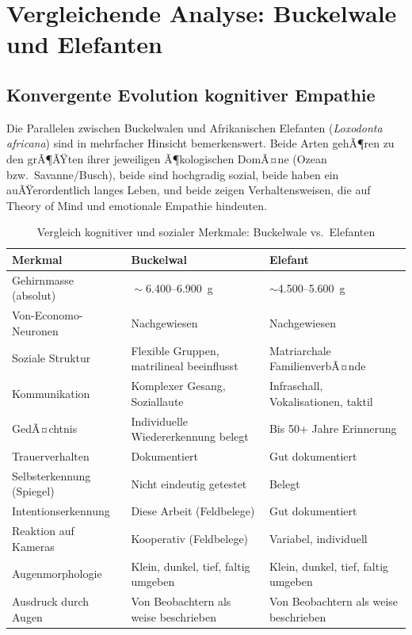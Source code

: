 ﻿\documentclass[12pt,a4paper]{article}
\theoremstyle{definition}
\theoremstyle{remark}
\begin{document}
\section{Vergleichende Analyse: Buckelwale und Elefanten}
\label{sec:elefanten}

\subsection{Konvergente Evolution kognitiver Empathie}

Die Parallelen zwischen Buckelwalen und Afrikanischen Elefanten
(\textit{Loxodonta africana}) sind in mehrfacher Hinsicht bemerkenswert.
Beide Arten gehÃ¶ren zu den grÃ¶ÃŸten ihrer jeweiligen Ã¶kologischen DomÃ¤ne
(Ozean bzw.\ Savanne/Busch), beide sind hochgradig sozial, beide haben
ein auÃŸerordentlich langes Leben, und beide zeigen Verhaltensweisen, die auf
Theory of Mind und emotionale Empathie hindeuten.

\begin{table}[h]
  \centering
  \caption{Vergleich kognitiver und sozialer Merkmale: Buckelwale vs.\ Elefanten}
  \label{tab:vergleich}
  \begin{tabularx}{\textwidth}{lXX}
    \toprule
    \textbf{Merkmal} & \textbf{Buckelwal} & \textbf{Elefant} \\
    \midrule
    Gehirnmasse (absolut) & $\sim$6.400--6.900~g & $\sim$4.500--5.600~g \\
    Von-Economo-Neuronen & Nachgewiesen & Nachgewiesen \\
    Soziale Struktur & Flexible Gruppen, matrilineal beeinflusst &
      Matriarchale FamilienverbÃ¤nde \\
    Kommunikation & Komplexer Gesang, Soziallaute & Infraschall, Vokalisationen, taktil \\
    GedÃ¤chtnis & Individuelle Wiedererkennung belegt & Bis 50+ Jahre Erinnerung \\
    Trauerverhalten & Dokumentiert & Gut dokumentiert \\
    Selbsterkennung (Spiegel) & Nicht eindeutig getestet & Belegt \\
    Intentionserkennung & Diese Arbeit (Feldbelege) & Gut dokumentiert \\
    Reaktion auf Kameras & Kooperativ (Feldbelege) & Variabel, individuell \\
    Augenmorphologie & Klein, dunkel, tief, faltig umgeben &
      Klein, dunkel, tief, faltig umgeben \\
    Ausdruck durch Augen & Von Beobachtern als weise beschrieben &
      Von Beobachtern als weise beschrieben \\
    \bottomrule
  \end{tabularx}
\end{table}
\end{document}
